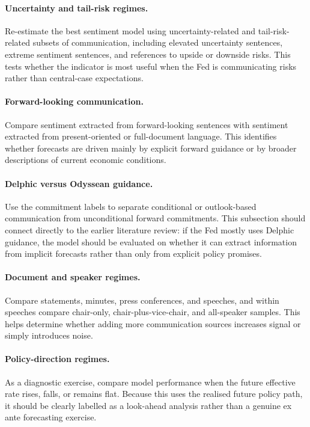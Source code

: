 \documentclass[11pt]{article}
\begin{document}
\paragraph{Uncertainty and tail-risk regimes.} Re-estimate the best sentiment model using uncertainty-related and tail-risk-related subsets of communication, including elevated uncertainty sentences, extreme sentiment sentences, and references to upside or downside risks. This tests whether the indicator is most useful when the Fed is communicating risks rather than central-case expectations.

\paragraph{Forward-looking communication.} Compare sentiment extracted from forward-looking sentences with sentiment extracted from present-oriented or full-document language. This identifies whether forecasts are driven mainly by explicit forward guidance or by broader descriptions of current economic conditions.

\paragraph{Delphic versus Odyssean guidance.} Use the commitment labels to separate conditional or outlook-based communication from unconditional forward commitments. This subsection should connect directly to the earlier literature review: if the Fed mostly uses Delphic guidance, the model should be evaluated on whether it can extract information from implicit forecasts rather than only from explicit policy promises.

\paragraph{Document and speaker regimes.} Compare statements, minutes, press conferences, and speeches, and within speeches compare chair-only, chair-plus-vice-chair, and all-speaker samples. This helps determine whether adding more communication sources increases signal or simply introduces noise.

\paragraph{Policy-direction regimes.} As a diagnostic exercise, compare model performance when the future effective rate rises, falls, or remains flat. Because this uses the realised future policy path, it should be clearly labelled as a look-ahead analysis rather than a genuine ex ante forecasting exercise.
\end{document}
